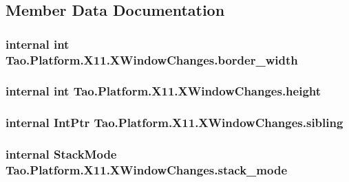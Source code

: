 \subsection{Member Data Documentation}
\hypertarget{struct_tao_1_1_platform_1_1_x11_1_1_x_window_changes_aacd35eafc0416996279c55b7329a716d}{
\subsubsection[{border\_\-width}]{\setlength{\rightskip}{0pt plus 5cm}internal int {\bf Tao.Platform.X11.XWindowChanges.border\_\-width}}}
\label{struct_tao_1_1_platform_1_1_x11_1_1_x_window_changes_aacd35eafc0416996279c55b7329a716d}
\hypertarget{struct_tao_1_1_platform_1_1_x11_1_1_x_window_changes_a5416841edb8d6789fca497c4f81e5a98}{
\subsubsection[{height}]{\setlength{\rightskip}{0pt plus 5cm}internal int {\bf Tao.Platform.X11.XWindowChanges.height}}}
\label{struct_tao_1_1_platform_1_1_x11_1_1_x_window_changes_a5416841edb8d6789fca497c4f81e5a98}
\hypertarget{struct_tao_1_1_platform_1_1_x11_1_1_x_window_changes_abd4a955e9453a1a9f5d7dd37e3e9e2f9}{
\subsubsection[{sibling}]{\setlength{\rightskip}{0pt plus 5cm}internal IntPtr {\bf Tao.Platform.X11.XWindowChanges.sibling}}}
\label{struct_tao_1_1_platform_1_1_x11_1_1_x_window_changes_abd4a955e9453a1a9f5d7dd37e3e9e2f9}
\hypertarget{struct_tao_1_1_platform_1_1_x11_1_1_x_window_changes_ad3e76c50d9a4fe9465c832fa349b7b04}{
\subsubsection[{stack\_\-mode}]{\setlength{\rightskip}{0pt plus 5cm}internal {\bf StackMode} {\bf Tao.Platform.X11.XWindowChanges.stack\_\-mode}}}

